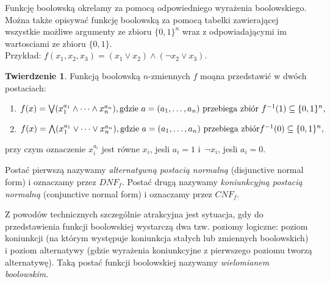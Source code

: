 \documentclass[a4paper,11pt,twoside]{article}
\theoremstyle{definition}
\newtheorem{tw}{Twierdzenie}
\begin{document}
Funkcję boolowską okrelamy za pomocą odpowiedniego wyrażenia boolowskiego. Można także opisywać funkcję boolowską za pomocą tabelki zawierającej wszystkie możliwe argumenty ze zbioru $\{0,1\}^n$ wraz z odpowiadającymi im wartosciami ze zbioru $\{0,1\}$.\\

Przykład: $f(x_1,x_2,x_3) = (x_1 \vee x_2) \wedge (\neg x_2 \vee x_3)$.

\begin{tw}
Funkcją boolowską $n$-zmiennych $f$ moąna przedstawić w dwóch postaciach:
\begin{enumerate}
\item $f(x) = \bigvee(x_1^{a_1} \wedge\dots\wedge x_n^{a_n}),\textnormal{gdzie }a = (a_1,\dots,a_n) \textnormal{ przebiega zbiór } f^{-1}(1) \subseteq \{0,1\}^n,$
\item $f(x) = \bigwedge(x_1^{a_1} \vee\dots\vee x_n^{a_n}),\textnormal{gdzie }a = (a_1,\dots,a_n) \textnormal{ przebiega zbiór} f^{-1}(0) \subseteq \{0,1\}^n,$
\end{enumerate}
\end{tw}

przy czym oznaczenie $x_i^{a_i}$ jest równe $x_i$, jesli $a_i=1$ i~$\neg x_i$, jesli $a_i=0$.

Postać pierwszą nazywamy {\em alternatywną postacią normalną} (disjunctive normal form) i oznaczamy przez $\mathit{DNF}_f$. Postać drugą nazywamy {\em koniunkcyjną postacią normalną} (conjunctive normal form) i oznaczamy przez $\mathit{CNF}_f$.

Z powodów technicznych szczególnie atrakcyjna jest sytuacja, gdy do przedstawienia funkcji boo\-lowskiej wystarczą dwa tzw. poziomy logiczne: poziom koniunkcji (na którym występuje koniunkcja stałych lub zmiennych boolowskich) i poziom alternatywy (gdzie wyrażenia koniunkcyjne z pierwszego poziomu tworzą alternatywę). Taką postać funkcji boolowskiej nazywamy {\em wielomianem boolowskim}.
\end{document}
